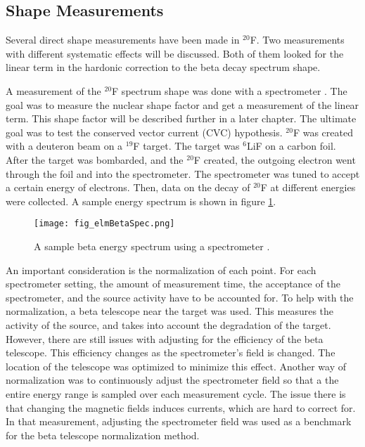 \documentclass[../MaxHughesThesis.tex]{subfiles}
\begin{document}
\subsection{Shape Measurements} 

Several direct shape measurements have been made in $^{20}$F.
Two measurements with different systematic effects will be discussed.
Both of them looked for the linear term in the hardonic correction to the beta decay spectrum shape. 

A measurement of the $^{20}$F spectrum shape was done with a spectrometer \cite{Elm87}.
The goal was to measure the nuclear shape factor and get a measurement of the linear term.
This shape factor will be described further in a later chapter.
The ultimate goal was to test the conserved vector current (CVC) hypothesis. 
$^{20}$F was created with a deuteron beam on a $^{19}$F target.
The target was $^{6}$LiF on a carbon foil.
After the target was bombarded, and the $^{20}$F created, the outgoing electron went through the foil and into the spectrometer.
The spectrometer was tuned to accept a certain energy of electrons. 
Then, data on the decay of $^{20}$F at different energies were collected.
A sample energy spectrum is shown in figure \ref{fig:elmspec}.

\begin{figure}[!htb]
	\centerline{\texttt{[image: fig\_elmBetaSpec.png]}}
	\caption{A sample beta energy spectrum using a spectrometer \cite{Elm87}.}
	\label{fig:elmspec}
\end{figure}

An important consideration is the normalization of each point.
For each spectrometer setting, the amount of measurement time, the acceptance of the spectrometer, and the source activity have to be accounted for.
To help with the normalization, a beta telescope near the target was used.
This measures the activity of the source, and takes into account the degradation of the target.
However, there are still issues with adjusting for the efficiency of the beta telescope.
This efficiency changes as the spectrometer's field is changed.
The location of the telescope was optimized to minimize this effect.
Another way of normalization was to continuously adjust the spectrometer field so that a the entire energy range is sampled over each measurement cycle.
The issue there is that changing the magnetic fields induces currents, which are hard to correct for. 
In that measurement, adjusting the spectrometer field was used as a benchmark for the beta telescope normalization method.
\end{document}
